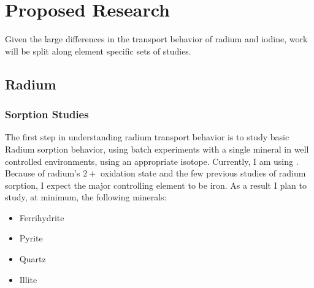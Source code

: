 \documentclass[twoside,12pt,titlepage]{article}
\newcommand{\isotope}[2]{\ch{^{#1}#2}}
\begin{document}
\section{Proposed Research}

Given the large differences in the transport behavior of radium and iodine, work will be split along element specific sets of studies.

\subsection{Radium}

\subsubsection{Sorption Studies}
The first step in understanding radium transport behavior is to study basic Radium sorption behavior, using batch experiments with a single mineral in well controlled environments, using an appropriate isotope. Currently, I am using \isotope{226}{Ra}. Because of radium's $2+$ oxidation state and the few previous studies of radium sorption, I expect the major controlling element to be iron. As a result I plan to study, at minimum, the following minerals:

\begin{itemize}
	\item Ferrihydrite
	\item Pyrite
	\item Quartz
	\item Illite
\end{itemize}
\end{document}

